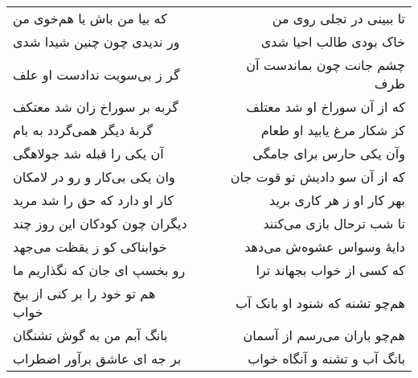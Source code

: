\begin{center}
\begin{longtable}{l p{0.5cm} r}
\\
که بیا من باش یا هم‌خوی من
&&
تا ببینی در تجلی روی من
\\
ور ندیدی چون چنین شیدا شدی
&&
خاک بودی طالب احیا شدی
\\
گر ز بی‌سویت ندادست او علف
&&
چشم جانت چون بماندست آن طرف
\\
گربه بر سوراخ زان شد معتکف
&&
که از آن سوراخ او شد معتلف
\\
گربهٔ دیگر همی‌گردد به بام
&&
کز شکار مرغ یابید او طعام
\\
آن یکی را قبله شد جولاهگی
&&
وآن یکی حارس برای جامگی
\\
وان یکی بی‌کار و رو در لامکان
&&
که از آن سو دادیش تو قوت جان
\\
کار او دارد که حق را شد مرید
&&
بهر کار او ز هر کاری برید
\\
دیگران چون کودکان این روز چند
&&
تا شب ترحال بازی می‌کنند
\\
خوابناکی کو ز یقظت می‌جهد
&&
دایهٔ وسواس عشوه‌ش می‌دهد
\\
رو بخسپ ای جان که نگذاریم ما
&&
که کسی از خواب بجهاند ترا
\\
هم تو خود را بر کنی از بیخ خواب
&&
هم‌چو تشنه که شنود او بانک آب
\\
بانگ آبم من به گوش تشنگان
&&
هم‌چو باران می‌رسم از آسمان
\\
بر جه ای عاشق برآور اضطراب
&&
بانگ آب و تشنه و آنگاه خواب
\\
\end{longtable}
\end{center}
